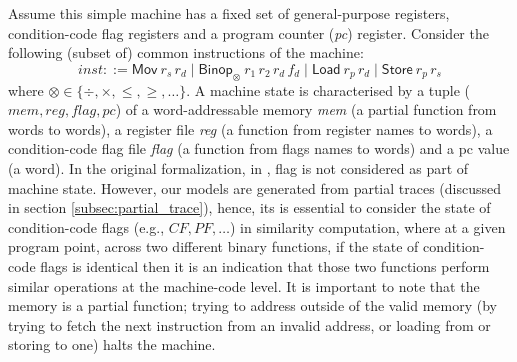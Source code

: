 Assume this simple machine has a fixed set of general-purpose registers, condition-code flag registers and a program counter (\textit{pc}) register. Consider the following (subset of) common instructions of the machine:
\begin{equation*}
inst ::= \mathsf{Mov} \: r_s\, r_d\; \vert \; \mathsf{Binop_\otimes} \: r_1\, r_2\, r_d\,f_d \; \vert \; \mathsf{Load} \: r_p\, r_d\; \vert \; \mathsf{Store} \: r_p\, r_s 
\end{equation*}
where $\otimes \in \lbrace \div, \times, \leq, \geq, \ldots\rbrace$. A machine state is characterised by a tuple ($mem, reg, flag, pc$) of a word-addressable memory \textit{mem} (a partial function from words to words), a register file \textit{reg} (a function from register names to words), a condition-code flag file \textit{flag} (a function from flags names to words) and a pc value (a word). In the original formalization, in \cite{de2015micro}, flag is not considered as part of machine state. However, our models are generated from partial traces (discussed in section \ref{subsec:partial_trace}), hence, its is essential to consider the state of condition-code flags (e.g., $CF, PF, \ldots$) in similarity computation, where at a given program point, across two different binary functions, if the state of condition-code flags is identical then it is an indication that those two functions perform similar operations at the machine-code level. It is important to note that the memory is a partial function; trying to address outside of the valid memory (by trying to fetch the next instruction from an invalid address, or loading from or storing to one) halts the machine.

